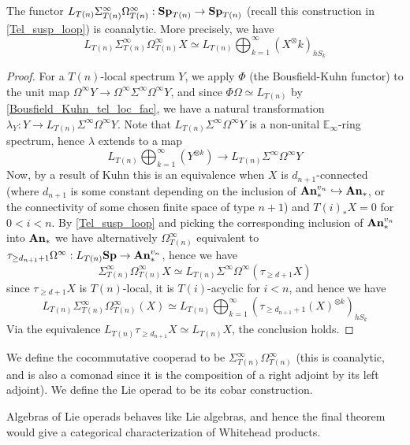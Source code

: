 	\begin{thm}\label{Susp_loop_adj_mon_coan}
		The functor $L_{T(n)}\Sigma^\infty_{T(n)}\Omega^\infty_{T(n)}:\mathbf{Sp}_{T(n)}\to\mathbf{Sp}_{T(n)}$ (recall this construction in \cref{Tel_susp_loop}) is coanalytic. More precisely, we have 
		\[ L_{T(n)}\Sigma^\infty_{T(n)}\Omega^\infty_{T(n)}X\simeq L_{T(n)}\bigoplus_{k=1}^\infty(X^\otimes k)_{hS_k} \]
	\end{thm}
	\begin{proof}
		For a $T(n)$-local spectrum $Y$, we apply $\Phi$ (the Bousfield-Kuhn functor) to the unit map $\Omega^\infty Y\to\Omega^\infty\Sigma^\infty\Omega^\infty Y$, and since $\Phi\Omega\simeq L_{T(n)}$ by \cref{Bousfield_Kuhn_tel_loc_fac}, we have a natural transformation $\lambda_Y:Y\to L_{T(n)}\Sigma^\infty\Omega^\infty Y$. Note that $L_{T(n)}\Sigma^\infty\Omega^\infty Y$ is a non-unital $\mathbb{E}_\infty$-ring spectrum, hence $\lambda$ extends to a map 
		\[ L_{T(n)}\bigoplus_{k=1}^\infty(Y^{\otimes k})\to L_{T(n)}\Sigma^\infty\Omega^\infty Y \]
		Now, by a result of Kuhn this is an equivalence when $X$ is $d_{n+1}$-connected (where $d_{n+1}$ is some constant depending on the inclusion of $\mathbf{An}_*^{v_n}\hookrightarrow\mathbf{An}_*$, or the connectivity of some chosen finite space of type $n+1$) and $T(i)_*X=0$ for $0<i<n$. By \cref{Tel_susp_loop} and picking the corresponding inclusion of $\mathbf{An}_*^{v_n}$ into $\mathbf{An}_*$ we have alternatively $\Omega^\infty_{T(n)}$ equivalent to $\tau_{\geq d_{n+1}+1}\Omega^\infty:L_{T(n)}\mathbf{Sp}\to\mathbf{An}_*^{v_n}$, hence we have 
		\[ \Sigma^\infty_{T(n)}\Omega^\infty_{T(n)}X\simeq L_{T(n)}\Sigma^\infty\Omega^\infty(\tau_{\geq d+1}X) \]
		since $\tau_{\geq d+1}X$ is $T(n)$-local, it is $T(i)$-acyclic for $i<n$, and hence we have 
		\[ L_{T(n)}\Sigma^\infty_{T(n)}\Omega^\infty_{T(n)}(X)\simeq L_{T(n)}\bigoplus_{k=1}^\infty(\tau_{\geq d_{n+1}+1}(X)^{\otimes k})_{hS_k} \]
		Via the equivalence $L_{T(n)}\tau_{\geq d_{n+1}}X\simeq L_{T(n)}X$, the conclusion holds. 
	\end{proof}

	\begin{defn}\label{Cocomm_coop_Lie_operad}
		We define the cocommutative cooperad to be $\Sigma^\infty_{T(n)}\Omega^\infty_{T(n)}$ (this is coanalytic, and is also a comonad since it is the composition of a right adjoint by its left adjoint). We define the Lie operad to be its cobar construction. 
	\end{defn}

	\begin{remark}
		Algebras of Lie operads behaves like Lie algebras, and hence the final theorem would give a categorical characterization of Whitehead products. 
	\end{remark}

